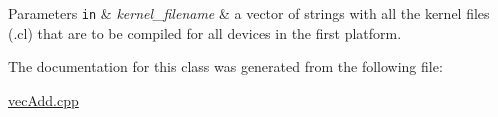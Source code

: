 \begin{DoxyParams}[1]{Parameters}
\mbox{\tt in}  & {\em kernel\+\_\+filename} & a vector of strings with all the kernel files (.cl) that are to be compiled for all devices in the first platform. \\
\hline
\end{DoxyParams}


The documentation for this class was generated from the following file\+:\begin{DoxyCompactItemize}
\item 
\hyperlink{vecAdd_8cpp}{vec\+Add.\+cpp}\end{DoxyCompactItemize}
